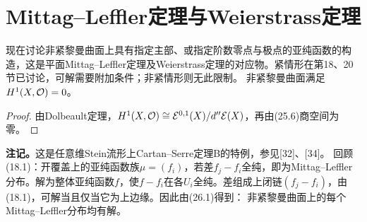 \section{Mittag--Leffler定理与Weierstrass定理}
现在讨论非紧黎曼曲面上具有指定主部、或指定阶数零点与极点的亚纯函数的构造，这是平面Mittag--Leffler定理及Weierstrass定理的对应物。紧情形在第18、20节已讨论，可解需要附加条件；非紧情形则无此限制。
非紧黎曼曲面满足$H^1(X,\mathcal O)=0$。
\begin{proof}
由Dolbeault定理，$H^1(X,\mathcal O)\cong\mathcal E^{0,1}(X)/d''\mathcal E(X)$，再由(25.6)商空间为零。
\end{proof}
\textbf{注记。}这是任意维Stein流形上Cartan--Serre定理B的特例，参见[32]、[34]。
回顾(18.1)：开覆盖上的亚纯函数族$\mu=(f_i)$，若差$f_j-f_i$全纯，即为Mittag--Leffler分布。解为整体亚纯函数$f$，使$f-f_i$在各$U_i$全纯。差组成上闭链$(f_j-f_i)$，由(18.1)，可解当且仅当它为上边缘。因此由(26.1)得到：
非紧黎曼曲面上的每个Mittag--Leffler分布均有解。


